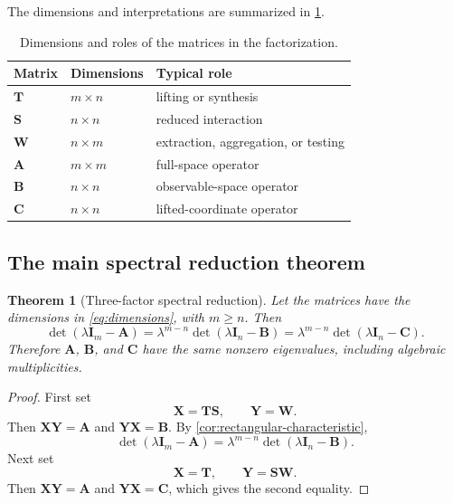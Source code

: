 \documentclass[11pt]{article}
\newcommand{\I}{\mathbf{I}}
\newcommand{\mat}[1]{\mathbf{#1}}
\newtheorem{theorem}{Theorem}[section]
\theoremstyle{definition}
\theoremstyle{remark}
\begin{document}
The dimensions and interpretations are summarized in \cref{tab:dimensions}.

\begin{table}[htbp]
  \centering
  \caption{Dimensions and roles of the matrices in the factorization.}
  \label{tab:dimensions}
  \begin{tabular}{lll}
    \toprule
    Matrix & Dimensions & Typical role \\
    \midrule
    \(\mat{T}\) & \(m\times n\) & lifting or synthesis \\
    \(\mat{S}\) & \(n\times n\) & reduced interaction \\
    \(\mat{W}\) & \(n\times m\) & extraction, aggregation, or testing \\
    \(\mat{A}\) & \(m\times m\) & full-space operator \\
    \(\mat{B}\) & \(n\times n\) & observable-space operator \\
    \(\mat{C}\) & \(n\times n\) & lifted-coordinate operator \\
    \bottomrule
  \end{tabular}
\end{table}

\subsection{The main spectral reduction theorem}

\begin{theorem}[Three-factor spectral reduction]
\label{thm:three-factor}
Let the matrices have the dimensions in \cref{eq:dimensions}, with \(m\geq n\). Then
\begin{equation}
  \det(\lambda\I_m-\mat{A})
  =
  \lambda^{m-n}\det(\lambda\I_n-\mat{B})
  =
  \lambda^{m-n}\det(\lambda\I_n-\mat{C}).
  \label{eq:three-factor-characteristic}
\end{equation}
Therefore \(\mat{A}\), \(\mat{B}\), and \(\mat{C}\) have the same nonzero eigenvalues, including algebraic multiplicities.
\end{theorem}

\begin{proof}
First set
\[
  \mat{X}=\mat{T}\mat{S},
  \qquad
  \mat{Y}=\mat{W}.
\]
Then \(\mat{X}\mat{Y}=\mat{A}\) and
\(\mat{Y}\mat{X}=\mat{B}\). By \cref{cor:rectangular-characteristic},
\[
  \det(\lambda\I_m-\mat{A})
  =\lambda^{m-n}\det(\lambda\I_n-\mat{B}).
\]
Next set
\[
  \mat{X}=\mat{T},
  \qquad
  \mat{Y}=\mat{S}\mat{W}.
\]
Then \(\mat{X}\mat{Y}=\mat{A}\) and
\(\mat{Y}\mat{X}=\mat{C}\), which gives the second equality.
\end{proof}
\end{document}
